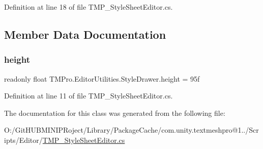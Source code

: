Definition at line 18 of file T\+M\+P\+\_\+\+Style\+Sheet\+Editor.\+cs.



\subsection{Member Data Documentation}
\mbox{\label{class_t_m_pro_1_1_editor_utilities_1_1_style_drawer_a73943e0e343bf68f7476b0572466052d}} 
\subsubsection{\texorpdfstring{height}{height}}
{\footnotesize\ttfamily readonly float T\+M\+Pro.\+Editor\+Utilities.\+Style\+Drawer.\+height = 95f\hspace{0.3cm}{\ttfamily [static]}}



Definition at line 11 of file T\+M\+P\+\_\+\+Style\+Sheet\+Editor.\+cs.



The documentation for this class was generated from the following file\+:\begin{DoxyCompactItemize}
\item 
O\+:/\+Git\+H\+U\+B\+M\+I\+N\+I\+P\+Roject/\+Library/\+Package\+Cache/com.\+unity.\+textmeshpro@1../\+Scripts/\+Editor/\mbox{\hyperlink{_t_m_p___style_sheet_editor_8cs}{T\+M\+P\+\_\+\+Style\+Sheet\+Editor.\+cs}}\end{DoxyCompactItemize}
